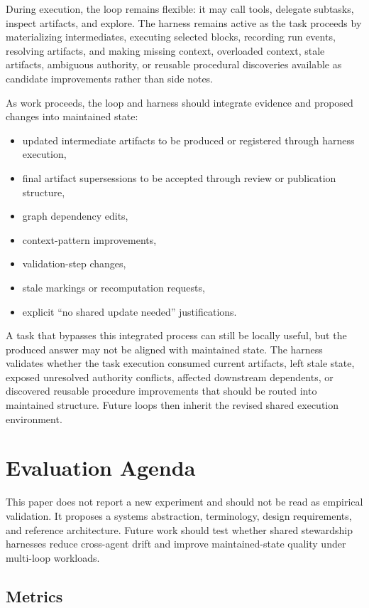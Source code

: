 \documentclass{article}
\begin{document}
During execution, the loop remains flexible: it may call tools, delegate subtasks, inspect artifacts, and explore. The harness remains active as the task proceeds by materializing intermediates, executing selected blocks, recording run events, resolving artifacts, and making missing context, overloaded context, stale artifacts, ambiguous authority, or reusable procedural discoveries available as candidate improvements rather than side notes.

As work proceeds, the loop and harness should integrate evidence and proposed changes into maintained state:
\begin{itemize}[leftmargin=*]
\item updated intermediate artifacts to be produced or registered through harness execution,
\item final artifact supersessions to be accepted through review or publication structure,
\item graph dependency edits,
\item context-pattern improvements,
\item validation-step changes,
\item stale markings or recomputation requests,
\item explicit ``no shared update needed'' justifications.
\end{itemize}

A task that bypasses this integrated process can still be locally useful, but the produced answer may not be aligned with maintained state. The harness validates whether the task execution consumed current artifacts, left stale state, exposed unresolved authority conflicts, affected downstream dependents, or discovered reusable procedure improvements that should be routed into maintained structure. Future loops then inherit the revised shared execution environment.

\section{Evaluation Agenda}

This paper does not report a new experiment and should not be read as empirical validation. It proposes a systems abstraction, terminology, design requirements, and reference architecture. Future work should test whether shared stewardship harnesses reduce cross-agent drift and improve maintained-state quality under multi-loop workloads.

\subsection{Metrics}
\end{document}
